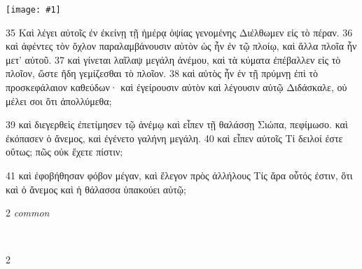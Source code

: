 \documentclass[10pt,a5paper,twoside,twocolumn]{book}
\newcommand{\fig}[1]{\texttt{[image: \#1]}\label{fig:#1}}
\newcommand*\cleartoleftpage{%
  \ifodd\value{page}\hbox{}\clearpage\fi
}
\newcommand{\separator}{
  \vspace{-0.5\baselineskip}%
  \hspace{0.27\textwidth}%
  \noindent\makebox[\linewidth]{\resizebox{0.3333\linewidth}{1pt}{$\bullet$}}\bigskip%
  \vspace{-0.5\baselineskip}
}
\newenvironment{facing}{\cleartoleftpage}{\clearpage\pagebreak}
\newenvironment{help}{\clearpage}{}
\newenvironment{helpsec}{\begin{minipage}[t]{\textwidth}\begin{multicols}{2}}{\end{multicols}\end{minipage}}
\newenvironment{vocab}{\begin{helpsec}}{\end{helpsec}}
\newenvironment{translation}{\separator\\\begin{helpsec}\footnotesize}{\end{helpsec}}
\begin{document}
\begin{facing}

\fig{04-39} %

	35 Καὶ λέγει αὐτοῖς ἐν ἐκείνῃ τῇ ἡμέρᾳ ὀψίας γενομένης Διέλθωμεν εἰς τὸ πέραν. 36 καὶ ἀφέντες τὸν ὄχλον παραλαμβάνουσιν αὐτὸν ὡς ἦν ἐν τῷ πλοίῳ, καὶ ἄλλα πλοῖα ἦν μετ’ αὐτοῦ. 37 καὶ γίνεται λαῖλαψ μεγάλη ἀνέμου, καὶ τὰ κύματα ἐπέβαλλεν εἰς τὸ πλοῖον, ὥστε ἤδη γεμίζεσθαι τὸ πλοῖον. 38 καὶ αὐτὸς ἦν ἐν τῇ πρύμνῃ ἐπὶ τὸ προσκεφάλαιον καθεύδων· καὶ ἐγείρουσιν αὐτὸν καὶ λέγουσιν αὐτῷ Διδάσκαλε, οὐ μέλει σοι ὅτι ἀπολλύμεθα; 

39 καὶ διεγερθεὶς ἐπετίμησεν τῷ ἀνέμῳ καὶ εἶπεν τῇ θαλάσσῃ Σιώπα, πεφίμωσο. καὶ ἐκόπασεν ὁ ἄνεμος, καὶ ἐγένετο γαλήνη μεγάλη. 40 καὶ εἶπεν αὐτοῖς Τί δειλοί ἐστε οὕτως; πῶς οὐκ ἔχετε πίστιν; 

41 καὶ ἐφοβήθησαν φόβον μέγαν, καὶ ἔλεγον πρὸς ἀλλήλους Τίς ἄρα οὗτός ἐστιν, ὅτι καὶ ὁ ἄνεμος καὶ ἡ θάλασσα ὑπακούει αὐτῷ;


\begin{help}
\begin{vocab}
\emph{common}\\

\end{vocab}
\begin{translation}

\end{translation}
\end{help}
\end{facing}
\end{document}
